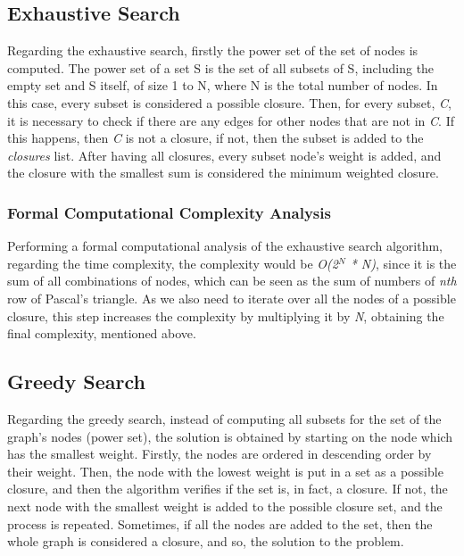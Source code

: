 \documentclass[...]{revdetua}
\begin{document}
\subsection{Exhaustive Search}

Regarding the exhaustive search, firstly the power set of the set of nodes is computed. The power set of a set S is the set of all subsets of S, including the empty set and S itself, of size 1 to N, where N is the total number of nodes. In this case, every subset is considered a possible closure. Then, for every subset, \textit{C}, it is necessary to check if there are any edges for other nodes that are not in \textit{C}. If this happens, then \textit{C} is not a closure, if not, then the subset is added to the \textit{closures} list. After having all closures, every subset node's weight is added, and the closure with the smallest sum is considered the minimum weighted closure.

\subsubsection{Formal Computational Complexity Analysis}


Performing a formal computational analysis of the exhaustive search algorithm, regarding the time complexity, the complexity would be \textit{O(2$^N$ * N)}, since it is the sum of all combinations of nodes, which can be seen as the sum of numbers of \textit{nth} row of Pascal's triangle. As we also need to iterate over all the nodes of a possible closure, this step increases the complexity by multiplying it by \textit{N}, obtaining the final complexity, mentioned above.

\subsection{Greedy Search}

Regarding the greedy search, instead of computing all subsets for the set of the graph's nodes (power set), the solution is obtained by starting on the node which has the smallest weight. Firstly, the nodes are ordered in descending order by their weight. Then, the node with the lowest weight is put in a set as a possible closure, and then the algorithm verifies if the set is, in fact, a closure. If not, the next node with the smallest weight is added to the possible closure set, and the process is repeated. Sometimes, if all the nodes are added to the set, then the whole graph is considered a closure, and so, the solution to the problem.
\end{document}
